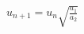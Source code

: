\documentclass[border=2.5pt]{standalone}
\begin{document}
$\displaystyle u_{n+1}=u_n\sqrt{\frac{a_1}{a_2}}$
\end{document}
